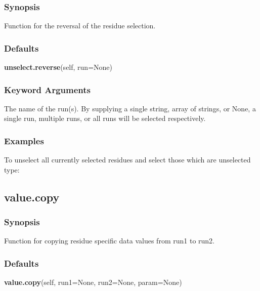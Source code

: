  
 \subsubsection{Synopsis} 

 Function for the reversal of the residue selection. 
  

  
 \subsubsection{Defaults} 

 \textsf{\textbf{unselect.reverse}(self, run=None)} 

  
 \subsubsection{Keyword Arguments} 

   The name of the run(s).  By supplying a single string, array of strings, or None, a single run, multiple runs, or all runs will be selected respectively.  

  

  
 \subsubsection{Examples} 

 To unselect all currently selected residues and select those which are unselected type: 
  


  

 \newpage 

 \subsection{value.copy} 

  
 \subsubsection{Synopsis} 

 Function for copying residue specific data values from run1 to run2. 
  

  
 \subsubsection{Defaults} 

 \textsf{\textbf{value.copy}(self, run1=None, run2=None, param=None)} 

